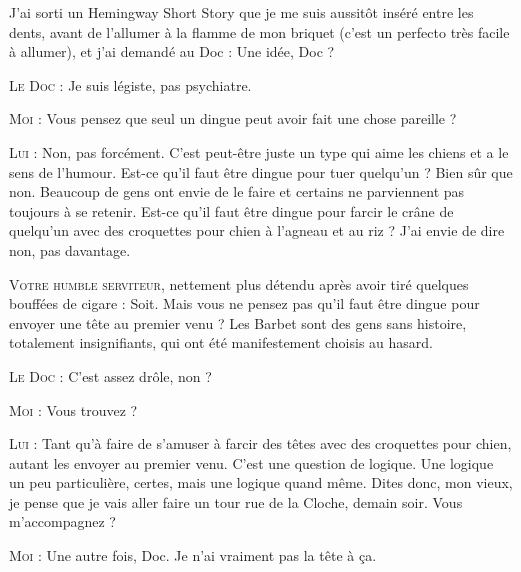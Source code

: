 \illusloflabel{}%
%
%
J’ai sorti un Hemingway Short Story que je me suis aussitôt inséré entre les dents, avant de l’allumer à la flamme de mon briquet (c’est un perfecto très facile à allumer), et j’ai demandé au Doc : Une idée, Doc ?

\begin{dialogue}

\textsc{Le Doc} : Je suis légiste, pas psychiatre.

\textsc{Moi} : Vous pensez que seul un dingue peut avoir fait une chose pareille ?

\textsc{Lui} : Non, pas forcément. C’est peut-être juste un type qui aime les chiens et a le sens de l’humour. Est-ce qu’il faut être dingue pour tuer quelqu’un ? Bien sûr que non. Beaucoup de gens ont envie de le faire et certains ne parviennent pas toujours à se retenir. Est-ce qu’il faut être dingue pour farcir le crâne de quelqu’un avec des croquettes pour chien à l’agneau et au riz ? J’ai envie de dire non, pas davantage.

\textsc{Votre humble serviteur}, nettement plus détendu après avoir tiré quel\-ques bouffées de cigare : Soit. Mais vous ne pensez pas qu’il faut être dingue pour envoyer une tête au premier venu ? Les Barbet sont des gens sans histoire, totalement insignifiants, qui ont été manifestement choisis au hasard.

\textsc{Le Doc} : C’est assez drôle, non ?

\textsc{Moi} : Vous trouvez ?

\textsc{Lui} : Tant qu’à faire de s’amuser à farcir des têtes avec des croquettes pour chien, autant les envoyer au premier venu. C’est une question de logique. Une logique un peu particulière, certes, mais une logique quand même. Dites donc, mon vieux, je pense que je vais aller faire un tour rue de la Cloche, demain soir. Vous m’accompagnez ?

\textsc{Moi} : Une autre fois, Doc. Je n’ai vraiment pas la tête à ça.

\end{dialogue}

